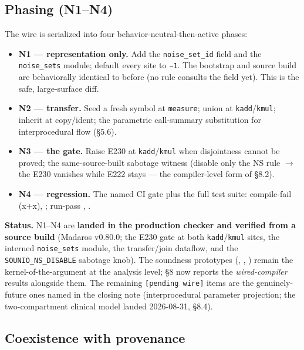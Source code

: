 \documentclass[sigplan,review,anonymous,10pt]{acmart}
\begin{document}
\subsection{Phasing (N1--N4)}

The wire is serialized into four behavior-neutral-then-active phases:

\begin{itemize}
  \item \textbf{N1 --- representation only.} Add the \texttt{noise\_set\_id} field and the \texttt{noise\_sets} module; default every site to \texttt{−1}. The bootstrap and source build are behaviorally identical to before (no rule consults the field yet). This is the safe, large-surface diff.
  \item \textbf{N2 --- transfer.} Seed a fresh symbol at \texttt{measure}; union at \texttt{kadd}/\texttt{kmul}; inherit at copy/ident; the parametric call-summary substitution for interprocedural flow (§5.6).
  \item \textbf{N3 --- the gate.} Raise E230 at \texttt{kadd}/\texttt{kmul} when disjointness cannot be proved; the same-source-built sabotage witness (disable only the NS rule $\rightarrow$ the E230 vanishes while E222 stays --- the compiler-level form of §8.2).
  \item \textbf{N4 --- regression.} The named CI gate  plus the full test suite: compile-fail  (x+x), ; run-pass , .
\end{itemize}

\textbf{Status.} N1--N4 are \textbf{landed in the production checker and verified from a source build} (Madaros v0.80.0; the E230 gate at both \texttt{kadd}/\texttt{kmul} sites, the interned \texttt{noise\_sets} module, the transfer/join dataflow, and the \texttt{SOUNIO\_NS\_DISABLE} sabotage knob). The soundness prototypes (, , ) remain the kernel-of-the-argument at the analysis level; §8 now reports the \emph{wired-compiler} results alongside them. The remaining \texttt{[pending wire]} items are the genuinely-future ones named in the closing note (interprocedural parameter projection; the two-compartment clinical model landed 2026-08-31, §8.4).

\subsection{Coexistence with provenance}
\end{document}
